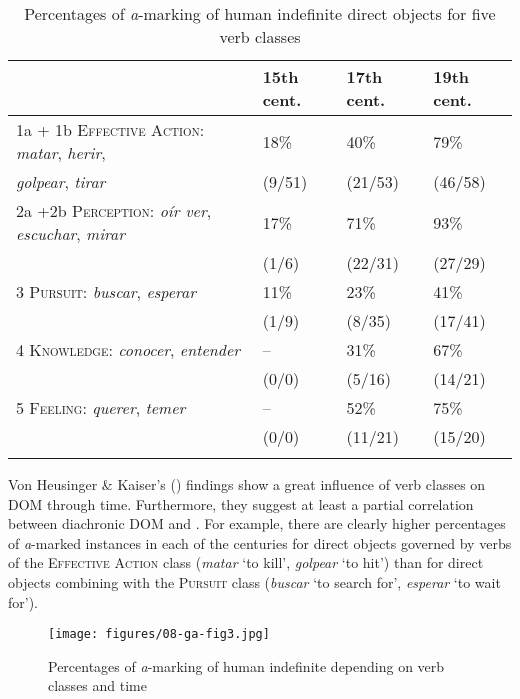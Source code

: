 \documentclass[output=paper]{LSP/langsci}
\begin{document}
\begin{table}
\begin{tabularx}{\textwidth}{Llll}
\lsptoprule
& 15th cent. & 17th cent. & 19th cent.\\
\midrule 
1a + 1b \textsc{Effective Action}: \textit{matar}, \textit{herir}, & 18\% & 40\% & 79\%\\
\textit{golpear}, \textit{tirar}& (9/51) & (21/53) & (46/58) \\

2a +2b \textsc{Perception}: \textit{oír ver}, \textit{escuchar}, \textit{mirar} & 17\% & 71\% & 93\% \\
				& (1/6) & (22/31) & (27/29)\\

3 \textsc{Pursuit}: \textit{buscar}, \textit{esperar} & 11\% & 23\% & 41\%\\
				 & (1/9) & (8/35) & (17/41)\\

4 \textsc{Knowledge}: \textit{conocer}, \textit{entender} &-- & 31\% & 67\% \\
					 & (0/0) & (5/16) & (14/21)\\

5 \textsc{Feeling}: \textit{querer}, \textit{temer} &-- & 52\% & 75\% \\
			& (0/0) & (11/21) & (15/20)\\
\lspbottomrule
\end{tabularx}
\caption{Percentages of \textit{a}-marking of human indefinite direct objects for five verb classes \citep[611]{vonHeusingeretal2011Affectedness}}\label{08-ga-tab:8}
\end{table}

Von Heusinger \& Kaiser’s (\citeyear{vonHeusingeretal2011Affectedness}) findings show a great influence of verb classes on DOM through time. Furthermore, they suggest at least a partial correlation between diachronic DOM and . For example, there are clearly higher percentages of \textit{a}-marked instances in each of the centuries for direct objects governed by verbs of the \textsc{Effective Action} class (\eg \textit{matar} ‘to kill’, \textit{golpear} ‘to hit’) than for direct objects combining with the \textsc{Pursuit} class (\eg \textit{buscar} ‘to search for’, \textit{esperar} ‘to wait for’). 

\begin{figure}
\texttt{[image: figures/08-ga-fig3.jpg]}
\caption{Percentages of \textit{a}-marking of human indefinite depending on verb classes and time \citep[611]{vonHeusingeretal2011Affectedness}}\label{08-ga-fig:3}
\end{figure}
\end{document}
